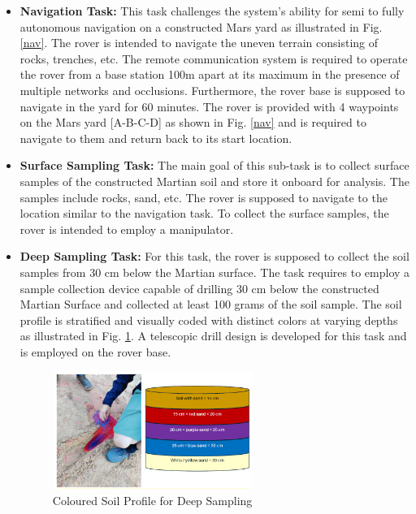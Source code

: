 \documentclass[letterpaper, 10 pt, conference]{ieeeconf}  %
\begin{document}
\begin{itemize}
    \item \textbf{Navigation Task:} 
    This task challenges the system’s ability for semi to fully autonomous navigation on a constructed Mars yard as illustrated in Fig. \ref{nav}. The rover is intended to navigate the uneven terrain consisting of rocks, trenches, etc. The remote communication system is required to operate the rover from a base station 100m apart at its maximum in the presence of multiple networks and occlusions. Furthermore, the rover base is supposed to navigate in the yard for 60 minutes. The rover is provided with 4 waypoints on the Mars yard [A-B-C-D] as shown in Fig. \ref{nav} and is required to navigate to them and return back to its start location. \cite{ERC} 
    
    \item \textbf{Surface Sampling Task:} The main goal of this sub-task is to collect surface samples of the constructed Martian soil and store it onboard for analysis. The samples include rocks, sand, etc. The rover is supposed to navigate to the location similar to the navigation task. To collect the surface samples, the rover is intended to employ a manipulator. \cite{ERC} 
    
    \item \textbf{Deep Sampling Task:} For this task, the rover is supposed to collect the soil samples from 30 cm below the Martian surface. The task requires to employ a sample collection device capable of drilling 30 cm below the constructed Martian Surface and collected at least 100 grams of the soil sample. The soil profile is stratified and visually coded with distinct colors at varying depths as illustrated in Fig. \ref{deepsample}. \cite{ERC} A telescopic drill design is developed for this task and is employed on the rover base. 

    \begin{figure}[htbp]
    \centerline{\includegraphics[width=65mm]{Deep_sample.PNG}}
    \caption{Coloured Soil Profile for Deep Sampling \cite{ERC}}
    \label{deepsample}
    \end{figure}
\end{itemize}
\end{document}
